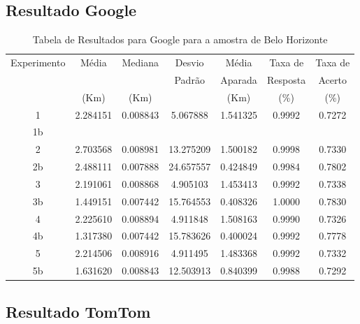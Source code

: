 \begin{anexosenv}
\subsection{Resultado Google}

\begin{table}[ht]
\centering
\begin{tabular}{|c|c|c|c|c|c|c|}
\hline
Experimento & Média & Mediana & Desvio & Média & Taxa de & Taxa de \\
 & & & Padrão & Aparada & Resposta & Acerto \\
 & (Km) & (Km) & & (Km) & (\%) & (\%) \\ \hline
1 & 2.284151 & 0.008843 & 5.067888 & 1.541325 & 0.9992 & 0.7272 \\ \hline
1b &  &  &  &  &  &  \\ \hline
2 & 2.703568 & 0.008981 & 13.275209 & 1.500182 & 0.9998 & 0.7330 \\ \hline
2b & 2.488111 & 0.007888 & 24.657557 & 0.424849 & 0.9984 & 0.7802 \\ \hline
3 & 2.191061 & 0.008868 & 4.905103 & 1.453413 & 0.9992 & 0.7338 \\ \hline
3b & 1.449151 & 0.007442 & 15.764553 & 0.408326 & 1.0000 & 0.7830 \\ \hline
4 & 2.225610 & 0.008894 & 4.911848 & 1.508163 & 0.9990 & 0.7326 \\ \hline
4b & 1.317380 & 0.007442 & 15.783626 & 0.400024 & 0.9992 & 0.7778 \\ \hline
5 & 2.214506 & 0.008916 & 4.911495 & 1.483368 & 0.9992 & 0.7332 \\ \hline
5b & 1.631620 & 0.008843 & 12.503913 & 0.840399 & 0.9988 & 0.7292 \\ \hline
\end{tabular}
\caption{Tabela de Resultados para Google para a amostra de Belo Horizonte}
\label{tab:googleBH}
\end{table}

\subsection{Resultado TomTom}


\end{anexosenv}
